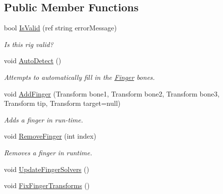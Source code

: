 \subsection*{Public Member Functions}
\begin{DoxyCompactItemize}
\item 
bool \mbox{\hyperlink{class_root_motion_1_1_final_i_k_1_1_finger_rig_ada25c469ee86aef1bfb916fca8b180ed}{Is\+Valid}} (ref string error\+Message)
\begin{DoxyCompactList}\small\item\em Is this rig valid? \end{DoxyCompactList}\item 
void \mbox{\hyperlink{class_root_motion_1_1_final_i_k_1_1_finger_rig_a0473028172a161fbb647501464b6572c}{Auto\+Detect}} ()
\begin{DoxyCompactList}\small\item\em Attempts to automatically fill in the \mbox{\hyperlink{class_root_motion_1_1_final_i_k_1_1_finger}{Finger}} bones. \end{DoxyCompactList}\item 
void \mbox{\hyperlink{class_root_motion_1_1_final_i_k_1_1_finger_rig_a00b244631d9aa58b617df037522076e4}{Add\+Finger}} (Transform bone1, Transform bone2, Transform bone3, Transform tip, Transform target=null)
\begin{DoxyCompactList}\small\item\em Adds a finger in run-\/time. \end{DoxyCompactList}\item 
void \mbox{\hyperlink{class_root_motion_1_1_final_i_k_1_1_finger_rig_aa54ad08339b2d3c73d4e2e8a57946014}{Remove\+Finger}} (int index)
\begin{DoxyCompactList}\small\item\em Removes a finger in runtime. \end{DoxyCompactList}\item 
void \mbox{\hyperlink{class_root_motion_1_1_final_i_k_1_1_finger_rig_a4fc899938332f07b4621ce12129041b2}{Update\+Finger\+Solvers}} ()
\item 
void \mbox{\hyperlink{class_root_motion_1_1_final_i_k_1_1_finger_rig_a07b2ccee722533677eaac8031cc24258}{Fix\+Finger\+Transforms}} ()
\end{DoxyCompactItemize}
